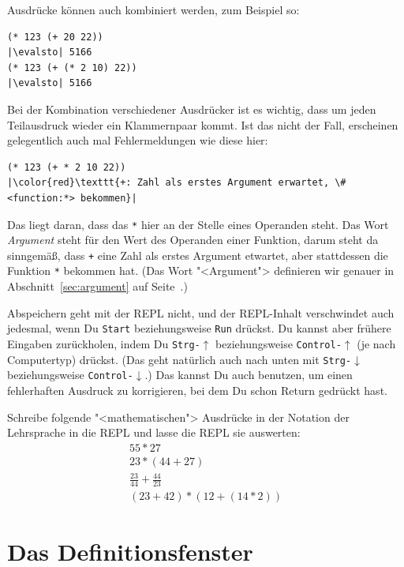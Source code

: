 Ausdrücke können auch kombiniert werden, zum Beispiel so:
%
\begin{lstlisting}
(* 123 (+ 20 22))
|\evalsto| 5166
(* 123 (+ (* 2 10) 22))
|\evalsto| 5166
\end{lstlisting}
%
Bei der Kombination verschiedener Ausdrücker ist es wichtig,
dass um jeden Teilausdruck wieder ein
Klammernpaar kommt.  Ist das nicht der Fall, erscheinen gelegentlich
auch mal Fehlermeldungen wie diese hier:
%
\begin{lstlisting}
(* 123 (+ * 2 10 22))
|\color{red}\texttt{+: Zahl als erstes Argument erwartet, \#<function:*> bekommen}|
\end{lstlisting}
%
Das liegt daran, dass das \lstinline{*} hier an der Stelle eines
Operanden steht.  Das Wort \textit{Argument} steht für
den Wert des Operanden einer Funktion, darum steht da sinngemäß, dass
\lstinline{+} eine Zahl als erstes Argument etwartet, aber
stattdessen die Funktion \lstinline{*} bekommen hat.  (Das Wort
"<Argument"> definieren wir genauer in Abschnitt~\ref{sec:argument} auf
Seite~\pageref{sec:argument}.)

Abspeichern geht mit der REPL nicht, und der REPL-Inhalt verschwindet
auch jedesmal, wenn Du \texttt{Start} beziehungsweise \texttt{Run} drückst.  Du
kannst aber frühere Eingaben zurückholen, indem Du
\texttt{Strg-$\uparrow$} beziehungsweise \texttt{Control-$\uparrow$}
(je nach Computertyp) drückst.  (Das geht natürlich auch nach unten
mit \texttt{Strg-$\downarrow$} beziehungsweise
\texttt{Control-$\downarrow$}.)
Das kannst Du auch benutzen, um einen
fehlerhaften Ausdruck zu korrigieren, bei dem Du schon Return gedrückt hast.

\begin{aufgabeinline}
  Schreibe folgende "<mathematischen"> Ausdrücke in der Notation der
  Lehrsprache in die REPL und lasse die REPL sie auswerten:
  \begin{displaymath}
    \begin{array}{c}
      55 * 27\\
      23 * (44 + 27)\\
      \frac{23}{44} + \frac{44}{23}\\
      (23 + 42) * (12 + (14 * 2))
    \end{array}
  \end{displaymath}
\end{aufgabeinline}
%
\section{Das Definitionsfenster}

